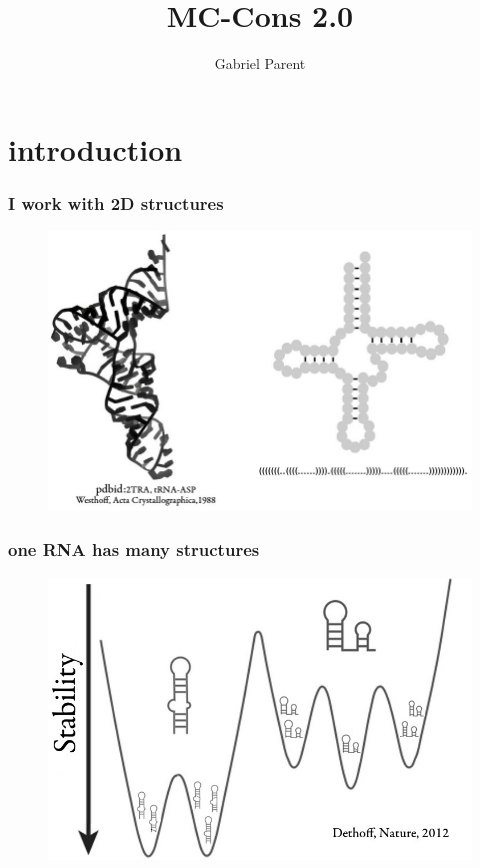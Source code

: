 \documentclass{beamer}
\title{MC-Cons 2.0}
\author{Gabriel Parent}
\begin{document}
\maketitle


\section{introduction}

\begin{frame}
	\frametitle{I work with 2D structures}
	\begin{figure}[!htb]
	\centering
	\includegraphics[scale=0.39]{figs/representations}
	\end{figure} 
\end{frame}


\begin{frame}
	\frametitle{one RNA has many structures}
	\begin{figure}
	\centering
	\includegraphics[scale=1.4]{figs/dynamics}
	\end{figure}
\end{frame}
\end{document}
